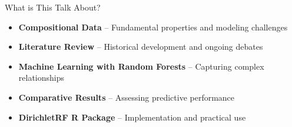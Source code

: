 \begin{frame}{What is This Talk About?}

\vspace{2em}
\vspace{1.5em}

\begin{itemize}
  \item[\textcolor{blue}{\large$\blacktriangleright$}] \textbf{Compositional Data} -- Fundamental properties and modeling challenges
  \vspace{1em}

  \item[\textcolor{blue}{\large$\blacktriangleright$}] \textbf{Literature Review} -- Historical development and ongoing debates
  \vspace{1em}

  \item[\textcolor{blue}{\large$\blacktriangleright$}] \textbf{Machine Learning with Random Forests} -- Capturing complex relationships
  \vspace{1em}

  \item[\textcolor{blue}{\large$\blacktriangleright$}] \textbf{Comparative Results} -- Assessing predictive performance
  \vspace{1em}

  \item[\textcolor{blue}{\large$\blacktriangleright$}] \textbf{DirichletRF R Package} -- Implementation and practical use
\end{itemize}

\vspace{2em}
\end{frame}



